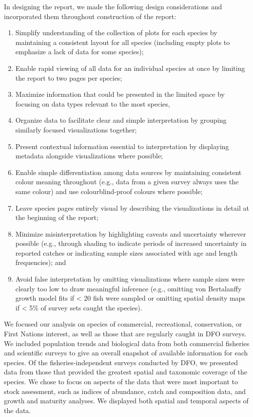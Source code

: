 \documentclass[12pt,]{article}
\providecommand{\tightlist}{%
  \setlength{\itemsep}{0pt}\setlength{\parskip}{0pt}}
\begin{document}

In designing the report, we made the following design considerations and incorporated them throughout construction of the report:

\begin{enumerate}
\def\labelenumi{\arabic{enumi}.}
\tightlist
\item
  Simplify understanding of the collection of plots for each species by maintaining a consistent layout for all species (including empty plots to emphasize a lack of data for some species);
\item
  Enable rapid viewing of all data for an individual species at once by limiting the report to two pages per species;
\item
  Maximize information that could be presented in the limited space by focusing on data types relevant to the most species,
\item
  Organize data to facilitate clear and simple interpretation by grouping similarly focused visualizations together;
\item
  Present contextual information essential to interpretation by displaying metadata alongside visualizations where possible;
\item
  Enable simple differentiation among data sources by maintaining consistent colour meaning throughout (e.g., data from a given survey always uses the same colour) and use colourblind-proof colours where possible;
\item
  Leave species pages entirely visual by describing the visualizations in detail at the beginning of the report;
\item
  Minimize misinterpretation by highlighting caveats and uncertainty wherever possible (e.g., through shading to indicate periods of increased uncertainty in reported catches or indicating sample sizes associated with age and length frequencies); and
\item
  Avoid false interpretation by omitting visualizations where sample sizes were clearly too low to draw meaningful inference (e.g., omitting von Bertalanffy growth model fits if \textless{} 20 fish were sampled or omitting spatial density maps if \textless{} 5\% of survey sets caught the species).
\end{enumerate}

We focused our analysis on species of commercial, recreational, conservation, or
First Nations interest, as well as those that are regularly caught in DFO surveys. We included population trends and biological data from both commercial fisheries and scientific surveys to give an overall snapshot of available information for each species. Of the fisheries-independent surveys conducted by DFO, we presented data from those that provided the greatest spatial and taxonomic coverage of the species. We chose to focus on aspects of the data that were most important to stock assessment, such as indices of abundance, catch and composition data, and growth and maturity analyses. We displayed both spatial and temporal aspects of the data.
\end{document}
